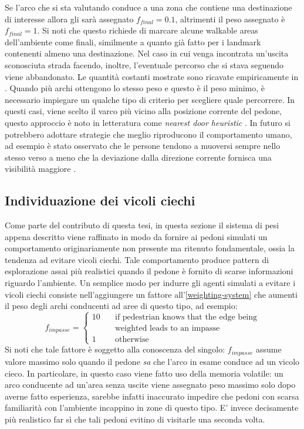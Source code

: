\documentclass[12pt,a4paper,openright,oneside]{book}
\begin{document}
Se l’arco che si sta valutando conduce a una zona che contiene una destinazione di interesse allora gli sarà assegnato \(f_{final} = 0.1\), altrimenti il peso assegnato è \(f_{final} = 1\). Si noti che questo richiede di marcare alcune walkable areas dell'ambiente come finali, similmente a quanto già fatto per i landmark contenenti almeno una destinazione. Nel caso in cui venga incontrata un’uscita sconosciuta strada facendo, inoltre, l’eventuale percorso che si stava seguendo viene abbandonato. Le quantità costanti mostrate sono ricavate empiricamente in \cite{Andresen2018}. Quando più archi ottengono lo stesso peso e questo è il peso minimo, è necessario impiegare un qualche tipo di criterio per scegliere quale percorrere. In questi casi, viene scelto il varco più vicino alla posizione corrente del pedone, questo approccio è noto in letteratura come \emph{nearest door heuristic} \cite{Silvers2016, Andresen2016TheIO}. In futuro si potrebbero adottare strategie che meglio riproducono il comportamento umano, ad esempio è stato osservato che le persone tendono a muoversi sempre nello stesso verso a meno che la deviazione dalla direzione corrente fornisca una visibilità maggiore \cite{Peponis1990}.

\subsection{Individuazione dei vicoli ciechi}
Come parte del contributo di questa tesi, in questa sezione il sistema di pesi appena descritto viene raffinato in modo da fornire ai pedoni simulati un comportamento originariamente non presente ma ritenuto fondamentale, ossia la tendenza ad evitare vicoli ciechi. Tale comportamento produce pattern di esplorazione assai più realistici quando il pedone è fornito di scarse informazioni riguardo l'ambiente. Un semplice modo per indurre gli agenti simulati a evitare i vicoli ciechi consiste nell'aggiungere un fattore all'\cref{weighting-system} che aumenti il peso degli archi conducenti ad aree di questo tipo, ad esempio:
\begin{equation}
f_{impasse} =
\begin{cases}
10       & \quad \text{if pedestrian knows that the edge being}\\
         & \quad \text{weighted leads to an impasse}\\
1        & \quad \text{otherwise}
\end{cases}
\end{equation}
Si noti che tale fattore è soggetto alla conoscenza del singolo: \(f_{impasse}\) assume valore massimo solo quando il pedone \emph{sa} che l'arco in esame conduce ad un vicolo cieco. In particolare, in questo caso viene fatto uso della memoria volatile: un arco conducente ad un'area senza uscite viene assegnato peso massimo solo dopo averne fatto esperienza, sarebbe infatti inaccurato impedire che pedoni con scarsa familiarità con l'ambiente incappino in zone di questo tipo. E' invece decisamente più realistico far sì che tali pedoni evitino di visitarle una seconda volta.
 
\end{document}
